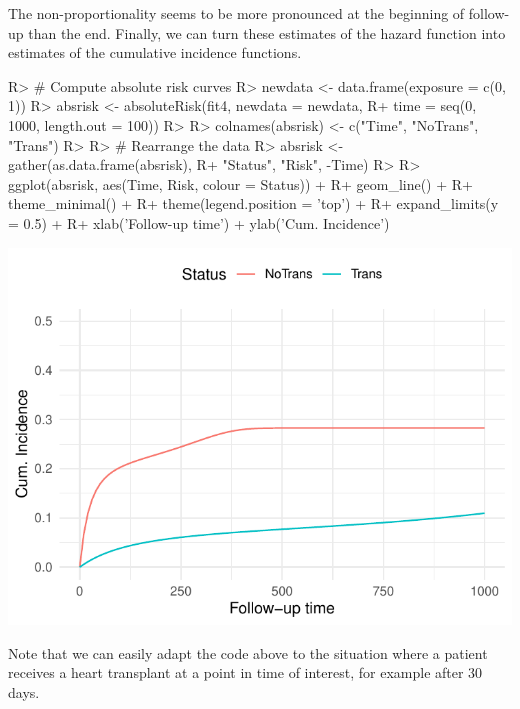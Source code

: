 \documentclass[
]{jss}
\begin{document}
The non-proportionality seems to be more pronounced at the beginning of
follow-up than the end. Finally, we can turn these estimates of the
hazard function into estimates of the cumulative incidence functions.

\begin{CodeChunk}

\begin{CodeInput}
R> # Compute absolute risk curves
R> newdata <- data.frame(exposure = c(0, 1))
R> absrisk <- absoluteRisk(fit4, newdata = newdata, 
R+                         time = seq(0, 1000, length.out = 100))
R> 
R> colnames(absrisk) <- c("Time", "NoTrans", "Trans")
R> 
R> # Rearrange the data
R> absrisk <- gather(as.data.frame(absrisk),
R+                   "Status", "Risk", -Time)
R>  
R> ggplot(absrisk, aes(Time, Risk, colour = Status)) +
R+   geom_line() +
R+   theme_minimal() +
R+   theme(legend.position = 'top') +
R+   expand_limits(y = 0.5) +
R+   xlab('Follow-up time') + ylab('Cum. Incidence')
\end{CodeInput}


\begin{center}\includegraphics{../figures/stanford-risk-1} \end{center}

\end{CodeChunk}

Note that we can easily adapt the code above to the situation where a
patient receives a heart transplant at a point in time of interest, for
example after 30 days.
\end{document}
